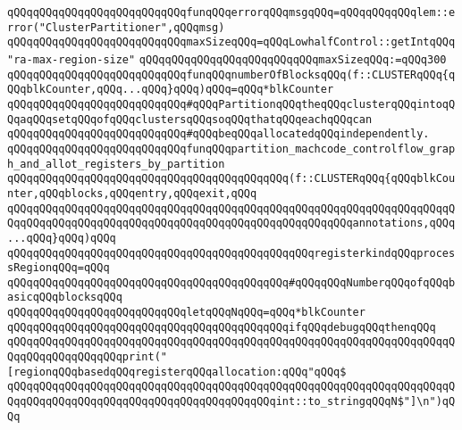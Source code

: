 \verb|qQQqqQQqqQQqqQQqqQQqqQQqqQQqfunqQQqerrorqQQqmsgqQQq=qQQqqQQqqQQqlem::error("ClusterPartitioner",qQQqmsg)|\newline
\newline
\verb|qQQqqQQqqQQqqQQqqQQqqQQqqQQqmaxSizeqQQq=qQQqLowhalfControl::getIntqQQq"ra-max-region-size"|\newline
\verb|qQQqqQQqqQQqqQQqqQQqqQQqqQQqmaxSizeqQQq:=qQQq300|\newline
\newline
\verb|qQQqqQQqqQQqqQQqqQQqqQQqqQQqfunqQQqnumberOfBlocksqQQq(f::CLUSTERqQQq{qQQqblkCounter,qQQq...qQQq}qQQq)qQQq=qQQq*blkCounter|\newline
\newline
\newline
\verb|qQQqqQQqqQQqqQQqqQQqqQQqqQQq#qQQqPartitionqQQqtheqQQqclusterqQQqintoqQQqaqQQqsetqQQqofqQQqclustersqQQqsoqQQqthatqQQqeachqQQqcan|\newline
\verb|qQQqqQQqqQQqqQQqqQQqqQQqqQQq#qQQqbeqQQqallocatedqQQqindependently.|\newline
\newline
\verb|qQQqqQQqqQQqqQQqqQQqqQQqqQQqfunqQQqpartition_machcode_controlflow_graph_and_allot_registers_by_partition|\newline
\verb|qQQqqQQqqQQqqQQqqQQqqQQqqQQqqQQqqQQqqQQqqQQq(f::CLUSTERqQQq{qQQqblkCounter,qQQqblocks,qQQqentry,qQQqexit,qQQq|\newline
\verb|qQQqqQQqqQQqqQQqqQQqqQQqqQQqqQQqqQQqqQQqqQQqqQQqqQQqqQQqqQQqqQQqqQQqqQQqqQQqqQQqqQQqqQQqqQQqqQQqqQQqqQQqqQQqqQQqqQQqqQQqqQQqannotations,qQQq...qQQq}qQQq)qQQq|\newline
\verb|qQQqqQQqqQQqqQQqqQQqqQQqqQQqqQQqqQQqqQQqqQQqqQQqregisterkindqQQqprocessRegionqQQq=qQQq|\newline
\verb|qQQqqQQqqQQqqQQqqQQqqQQqqQQqqQQqqQQqqQQqqQQq#qQQqqQQqNumberqQQqofqQQqbasicqQQqblocksqQQq|\newline
\verb|qQQqqQQqqQQqqQQqqQQqqQQqqQQqletqQQqNqQQq=qQQq*blkCounter|\newline
\newline
\verb|qQQqqQQqqQQqqQQqqQQqqQQqqQQqqQQqqQQqqQQqqQQqifqQQqdebugqQQqthenqQQq|\newline
\verb|qQQqqQQqqQQqqQQqqQQqqQQqqQQqqQQqqQQqqQQqqQQqqQQqqQQqqQQqqQQqqQQqqQQqqQQqqQQqqQQqqQQqqQQqprint("[regionqQQqbasedqQQqregisterqQQqallocation:qQQq"qQQq$|\newline
\verb|qQQqqQQqqQQqqQQqqQQqqQQqqQQqqQQqqQQqqQQqqQQqqQQqqQQqqQQqqQQqqQQqqQQqqQQqqQQqqQQqqQQqqQQqqQQqqQQqqQQqqQQqqQQqqQQqint::to_stringqQQqN$"]\n")qQQq|\newline
